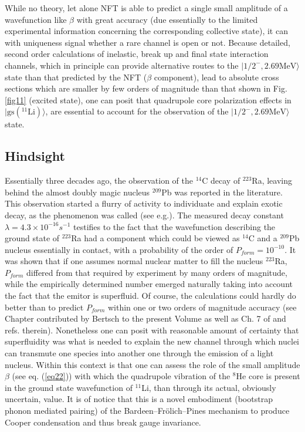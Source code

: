 \documentclass[a4paper,14pt]{book}
\begin{document}
While no theory, let alone NFT is able to predict a single small amplitude of a wavefunction like $\beta$ with great accuracy (due essentially to the limited experimental information concerning the corresponding collective state), it can with uniqueness signal whether a rare channel is open or not. Because detailed, second order calculations of inelastic, break up and final state interaction channels, which in principle can provide alternative routes to the  $|1/2^-,2.69\text{MeV}\rangle$ state than that predicted by the NFT  ($\beta$ component), lead to absolute cross sections which are smaller by few orders of magnitude than that shown in Fig. \ref{fig11} (excited state)\cite{Potel:10}, one can posit that quadrupole core polarization effects in $|\text{gs}(^{11}\text{Li})\rangle$, are essential to account for the observation of the $|1/2^-,2.69\text{MeV}\rangle$ state.
\subsection{Hindsight}
Essentially three decades ago, the observation of the $^{14}$C decay of $^{223}$Ra, leaving behind the almost doubly magic nucleus $^{209}$Pb was reported in the literature\cite{Rose:84}. This observation started a flurry of activity to individuate and explain exotic decay, as the phenomenon was called (see e.g.\cite{Price:89}). The measured decay constant $\lambda=4.3\times10^{-16}s^{-1}$ testifies to the fact that the wavefunction describing the ground state of $^{223}$Ra had a component which could be viewed as $^{14}$C and a $^{209}$Pb nucleus essentially in contact, with a probability of the order of $P_{form}=10^{-10}$. It was shown that if one assumes normal nuclear matter to fill the nucleus $^{223}$Ra, $P_{form}$ differed from that required by experiment by many orders of magnitude, while the empirically determined number emerged naturally taking into account the fact that the emitor is superfluid. Of course, the calculations could hardly do better than to predict $P_{form}$ within one or two orders of magnitude accuracy (see Chapter contributed by Bertsch to the present Volume as well as Ch. 7 of \cite{Brink:05} and refs. therein). Nonetheless one can posit with reasonable amount of certainty that superfluidity was what is needed to explain the new channel through which nuclei can transmute one species into another one through the emission of a light nucleus. Within this context is that one can assess the role of the small amplitude $\beta$ (see eq. (\ref{eq22})) with which the quadrupole vibration of the $^8$He core is present in the ground state wavefunction of $^{11}$Li, than through its actual, obviously uncertain, value. It is of notice that this is a novel embodiment  (bootstrap phonon mediated pairing) of the Bardeen--Fr\"{o}lich--Pines mechanism to produce Cooper condensation and thus break gauge invariance.
\end{document}
